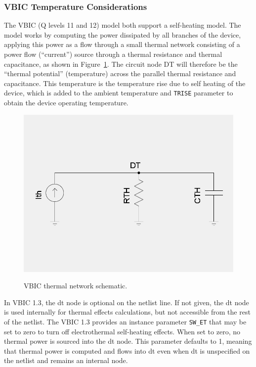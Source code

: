 \subsubsection{VBIC Temperature Considerations}
The VBIC (Q levels 11 and 12) model both support a self-heating
model.  The model works by computing the power dissipated by all
branches of the device, applying this power as a flow through a small
thermal network consisting of a power flow (``current'') source
through a thermal resistance and thermal capacitance, as shown in
Figure~\ref{vbicthermal}.  The circuit node DT will therefore be the
``thermal potential'' (temperature) across the parallel thermal
resistance and capacitance.  This temperature is the temperature rise
due to self heating of the device, which is added to the ambient
temperature and \texttt{TRISE} parameter to obtain the device
operating temperature.
\begin{figure}
  \centering
  \scalebox{0.3}
  {\includegraphics{VBIC_Thermal_Net}}
  \caption[VBIC thermal network schematic]{VBIC thermal network  schematic.}
  \label{vbicthermal}
\end{figure}

In VBIC 1.3, the dt node is optional on the netlist line.  If not
given, the dt node is used internally for thermal effects
calculations, but not accessible from the rest of the netlist.  The
VBIC 1.3 provides an instance parameter \texttt{SW\_ET} that may be
set to zero to turn off electrothermal self-heating effects.  When set
to zero, no thermal power is sourced into the dt node.  This parameter
defaults to 1, meaning that thermal power is computed and flows into
dt even when dt is unspecified on the netlist and remains an internal
node.

